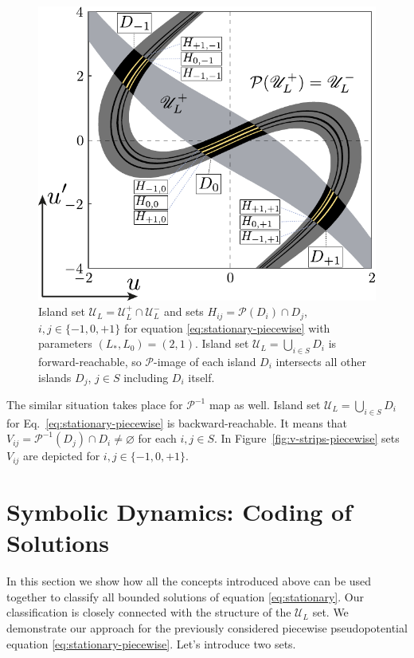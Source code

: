 \begin{figure}[h]
\centering
	\includegraphics[scale = 1]{pic/h-strips for piecewise equation}
	\caption{
		Island set $\mathscr{U}_L = \mathscr{U}_L^+ \cap \mathscr{U}_L^-$ and sets $H_{ij} = \mathcal{P}(D_i) \cap D_j$, $i, j \in \{ -1, 0, +1 \}$ for equation \eqref{eq:stationary-piecewise} with parameters $(L_*, L_0) = (2, 1)$.
		Island set $\mathscr{U}_L = \bigcup_{i \in S} D_i$ is forward-reachable, so $\mathcal{P}$-image of each island $D_i$ intersects all other islands $D_j$, $j \in S$ including $D_i$ itself.
	}
\label{fig:h-strips-piecewise}
\end{figure}

The similar situation takes place for $\mathcal{P}^{-1}$ map as well.
Island set $\mathscr{U}_L = \bigcup_{i \in S} D_i$ for Eq.~\eqref{eq:stationary-piecewise} is backward-reachable.
It means that $V_{ij} = \mathcal{P}^{-1}(D_j) \cap D_i \neq \varnothing$ for each $i, j \in S$.
In Figure~\ref{fig:v-strips-piecewise} sets $V_{ij}$ are depicted for $i, j \in \{ -1, 0, +1 \}$.

\section{Symbolic Dynamics: Coding of Solutions}

In this section we show how all the concepts introduced above can be used together to classify all bounded solutions of equation \eqref{eq:stationary}.
Our classification is closely connected with the structure of the $\mathscr{U}_L$ set.
We demonstrate our approach for the previously considered piecewise pseudopotential equation \eqref{eq:stationary-piecewise}.
Let's introduce two sets.

